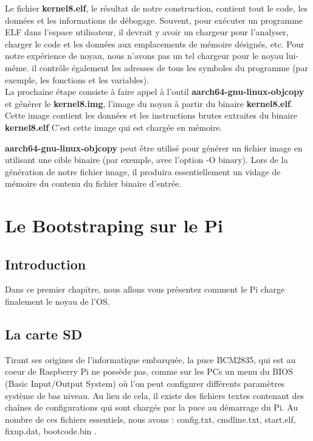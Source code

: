 \documentclass[12pt,a4paper,oneside]{book}
\begin{document}
	Le fichier \textbf{kernel8.elf}, le résultat de notre construction, contient tout le code, les données et les informations de débogage. Souvent, pour exécuter un programme ELF dans l’espace utilisateur, il devrait y avoir un chargeur pour l'analyser, charger le code et les données aux emplacements de mémoire désignés, etc. Pour notre expérience de noyau, nous n’avons pas un tel chargeur pour le noyau lui-même.  il contrôle également les adresses de tous les symboles du programme (par exemple, les fonctions et les variables).\\
	
	La prochaine étape consiste à faire appel à l'outil \textbf{aarch64-gnu-linux-objcopy} et générer le \textbf{kernel8.img}, l'image du noyau à partir du binaire \textbf{kernel8.elf}. Cette image contient les données et les instructions brutes extraites du binaire \textbf{kernel8.elf} C'est cette image qui est chargée en mémoire. 
	
	\textbf{aarch64-gnu-linux-objcopy} peut être utilisé pour générer un fichier image en utilisant une cible binaire (par exemple, avec l'option -O binary). Lors de la génération de notre fichier image, il produira essentiellement un vidage de mémoire du contenu du fichier binaire d’entrée.
	
	
	
	\chapter{Le Bootstraping sur le Pi}
	\section{Introduction}
	Dans ce premier chapitre, nous allons vous présentez comment le Pi charge finalement le noyau de l'OS.
	
	\section{La carte SD}
	
	Tirant ses origines de l'informatique embarquée, la puce BCM2835, qui est au coeur de Raspberry Pi ne possède pas, comme sur les PCs un menu du BIOS (Basic Input/Output System) où l'on peut configurer différents paramètres système de bas niveau. Au lieu de cela, il existe des fichiers textes contenant des chaînes de configurations qui sont chargés par la puce au démarrage du Pi. Au nombre de ces fichiers essentiels, nous avons : config.txt, cmdline.txt, start.elf, fixup.dat, bootcode.bin .
	 
\end{document}
